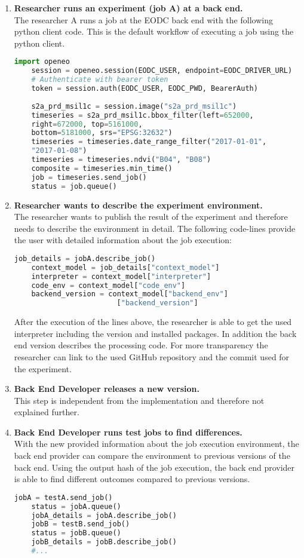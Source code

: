 \documentclass[draft,final]{vutinfth} %
\begin{document}
\begin{enumerate}
	\item \textbf{Researcher runs an experiment (job A) at a back end.}\\
	The researcher A runs a job at the EODC back end with the following python client code. This is the default workflow of executing a job using the python client.  
	\begin{lstlisting}[frame=single, language=Python]
	import openeo
	session = openeo.session(EODC_USER, endpoint=EODC_DRIVER_URL)
	# Authenticate with bearer token
	token = session.auth(EODC_USER, EODC_PWD, BearerAuth)
	
	s2a_prd_msil1c = session.image("s2a_prd_msil1c")
	timeseries = s2a_prd_msil1c.bbox_filter(left=652000, 
	right=672000, top=5161000,
	bottom=5181000, srs="EPSG:32632")
	timeseries = timeseries.date_range_filter("2017-01-01", 
	"2017-01-08")
	timeseries = timeseries.ndvi("B04", "B08")
	composite = timeseries.min_time()
	job = timeseries.send_job()
	status = job.queue()
	\end{lstlisting}
	\item \textbf{Researcher wants to describe the experiment environment.}\\
	The researcher wants to publish the result of the experiment and therefore needs to describe the environment in detail. The following code-lines provide the user with detailed information about the job execution:
	\begin{lstlisting}[frame=single, language=Python]
	job_details = jobA.describe_job()
	context_model = job_details["context_model"]
	interpreter = context_model["interpreter"]
	code_env = context_model["code_env"]
	backend_version = context_model["backend_env"]
						["backend_version"]
	\end{lstlisting}
	After the execution of the lines above, the researcher is able to get the used interpreter including the version and installed packages. In addition the back end version describes the processing code. For more transparency the researcher can link to the used GitHub repository and the commit used for the experiment. 
	
	\item \textbf{Back End Developer releases a new version.} \\
	This step is independent from the implementation and therefore not explained further.
	
	\item \textbf{Back End Developer runs test jobs to find differences.}\\
	With the new provided information about the job execution environment, the back end provider can compare the environment to previous versions of the back end. Using the output hash of the job execution, the back end provider is able to find different outcomes compared to previous versions. 
	\begin{lstlisting}[frame=single, language=Python]
	jobA = testA.send_job()
	status = jobA.queue()
	jobA_details = jobA.describe_job()
	jobB = testB.send_job()
	status = jobB.queue()
	jobB_details = jobB.describe_job()
	#...
	\end{lstlisting}
\end{enumerate}
\end{document}
